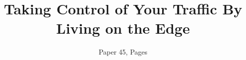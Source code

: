 \documentclass[letterpaper,twocolumn,10pt]{article}
\begin{document}
\setlength{\droptitle}{-1.5cm}

\title{\LARGE Taking Control of Your Traffic By Living on the Edge }
\author{Paper 45, \pageref{p:end} Pages}

\date{\vspace{-12mm}}

\maketitle

\begin{sloppypar}











\end{sloppypar}
\label{p:end}
\clearpage


\end{document}
